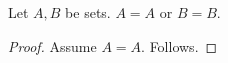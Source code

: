 \begin{proposition}\label{invalid_disjunct_assume}
    Let $A,B$ be sets.
    $A=A$ or $B=B$.
\end{proposition}
\begin{proof}
    Assume $A=A$.
    Follows.
\end{proof}
